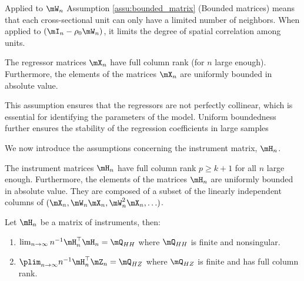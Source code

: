 \documentclass[english,12pt]{book}\usepackage[]{graphicx}\usepackage[]{xcolor}
\begin{document}
\begin{remark}
Applied to $\mW_n$ Assumption \ref{assu:bounded_matrix} (Bounded matrices) means that each cross-sectional unit can only have a limited number of neighbors. When applied to $\left(\mI_n - \rho _0\mW_n\right)$, it limits the degree of spatial correlation among units. 
\end{remark}

\begin{assumption}\label{assu:regressors}
The regressor matrices $\mX_n$ have full column rank (for $n$ large enough). Furthermore, the elements of the matrices $\mX_n$ are uniformly bounded in absolute value.
\end{assumption}

This assumption ensures that the regressors are not perfectly collinear, which is essential for identifying the parameters of the model. Uniform boundedness further ensures the stability of the regression coefficients in large samples

We now introduce the assumptions concerning the instrument matrix, $\mH_n$.

\begin{assumption}\label{assu:iv_instr}
The instrument matrices $\mH_n$ have full column rank $p \geq k + 1$ for all $n$ large enough. Furthermore, the elements of the matrices $\mH_n$ are uniformly bounded in absolute value. They are composed of a subset of the linearly independent columns of $(\mX_n, \mW_n\mX_n, \mW^2_n\mX_n, \ldots)$.
\end{assumption}


\begin{assumption}\label{assu:iv_instr_lim}
Let $\mH_n$ be a matrix of instruments, then:
\begin{enumerate}
  \item $\lim_{n\to \infty} n^{-1}\mH_n^\top\mH_n = \mQ_{HH}$ where $\mQ_{HH}$ is finite and nonsingular. 
  \item $\plim_{n\to \infty} n^{-1}\mH_n^\top\mZ_n = \mQ_{HZ}$ where $\mQ_{HZ}$ is finite and has full column rank.
\end{enumerate}
\end{assumption}
\end{document}
